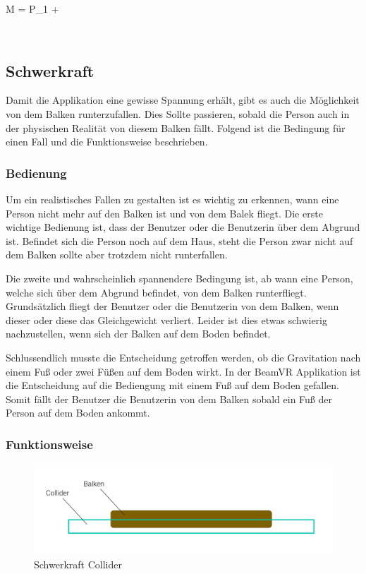 M = P_{1} +  

$$


\subsection{Schwerkraft}
\label{subsec:gravity}

Damit die Applikation eine gewisse Spannung erhält, gibt es auch die Möglichkeit von dem Balken runterzufallen.
Dies Sollte passieren, sobald die Person auch in der physischen Realität von diesem Balken fällt.
Folgend ist die Bedingung für einen Fall und die Funktionsweise beschrieben.

\subsubsection{Bedienung}

Um ein realistisches Fallen zu gestalten ist es wichtig zu erkennen, wann eine Person nicht mehr auf den Balken ist und von dem Balek fliegt.
Die erste wichtige Bedienung ist, dass der Benutzer oder die Benutzerin über dem Abgrund ist.
Befindet sich die Person noch auf dem Haus, steht die Person zwar nicht auf dem Balken sollte aber trotzdem nicht runterfallen.

Die zweite und wahrscheinlich spannendere Bedingung ist, ab wann eine Person, welche sich über dem Abgrund befindet, von dem Balken runterfliegt.
Grundsätzlich fliegt der Benutzer oder die Benutzerin von dem Balken, wenn dieser oder diese das Gleichgewicht verliert.
Leider ist dies etwas schwierig nachzustellen, wenn sich der Balken auf dem Boden befindet.

Schlussendlich musste die Entscheidung getroffen werden, ob die Gravitation nach einem Fuß oder zwei Füßen auf dem Boden wirkt.
In der BeamVR Applikation ist die Entscheidung auf die Bediengung mit einem Fuß auf dem Boden gefallen.
Somit fällt der Benutzer die Benutzerin von dem Balken sobald ein Fuß der Person auf dem Boden ankommt.

\subsubsection{Funktionsweise}

\begin{figure}
    \centering
    \includegraphics[scale=0.2]{pics/gravitation_collider}
    \caption{Schwerkraft Collider}
    \label{fig:gravitation-collider}
\end{figure}


